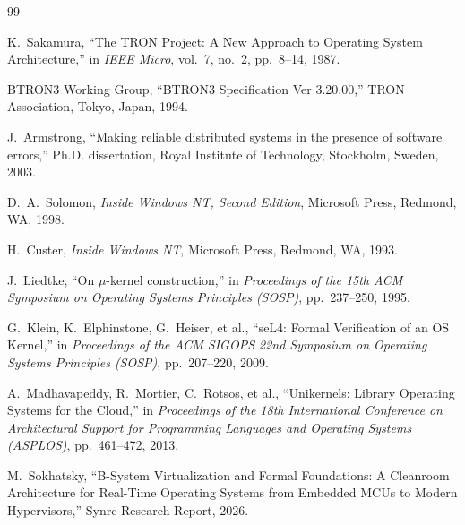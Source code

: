 \documentclass[10pt,journal,compsoc,twocolumn]{article}
\begin{document}
\begin{thebibliography}{99}

K.~Sakamura, ``The TRON Project: A New Approach to Operating System Architecture,'' in \emph{IEEE Micro}, vol.~7, no.~2, pp.~8--14, 1987.

BTRON3 Working Group, ``BTRON3 Specification Ver 3.20.00,'' TRON Association, Tokyo, Japan, 1994.

J.~Armstrong, ``Making reliable distributed systems in the presence of software errors,'' Ph.D. dissertation, Royal Institute of Technology, Stockholm, Sweden, 2003.

D.~A.~Solomon, \emph{Inside Windows NT, Second Edition}, Microsoft Press, Redmond, WA, 1998.

H.~Custer, \emph{Inside Windows NT}, Microsoft Press, Redmond, WA, 1993.

J.~Liedtke, ``On $\mu$-kernel construction,'' in \emph{Proceedings of the 15th ACM Symposium on Operating Systems Principles (SOSP)}, pp.~237--250, 1995.

G.~Klein, K.~Elphinstone, G.~Heiser, et al., ``seL4: Formal Verification of an OS Kernel,'' in \emph{Proceedings of the ACM SIGOPS 22nd Symposium on Operating Systems Principles (SOSP)}, pp.~207--220, 2009.

A.~Madhavapeddy, R.~Mortier, C.~Rotsos, et al., ``Unikernels: Library Operating Systems for the Cloud,'' in \emph{Proceedings of the 18th International Conference on Architectural Support for Programming Languages and Operating Systems (ASPLOS)}, pp.~461--472, 2013.

M.~Sokhatsky, ``B-System Virtualization and Formal Foundations: A Cleanroom Architecture for Real-Time Operating Systems from Embedded MCUs to Modern Hypervisors,'' Synrc Research Report, 2026.

\end{thebibliography}
\end{document}

